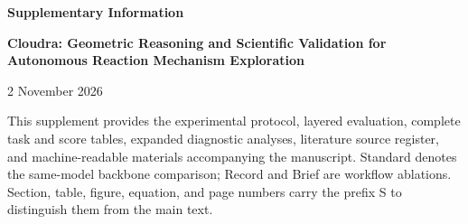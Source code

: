 \documentclass[10pt,a4paper]{article}
\begin{document}
\begin{center}
{\LARGE\bfseries Supplementary Information\par}
\vspace{0.6em}
{\large\bfseries Cloudra: Geometric Reasoning and Scientific Validation for Autonomous Reaction Mechanism Exploration\par}
\vspace{0.6em}

\vspace{0.6em}
{\small 2 November 2026\par}
\end{center}
\noindent This supplement provides the experimental protocol, layered evaluation, complete task and score tables, expanded diagnostic analyses, literature source register, and machine-readable materials accompanying the manuscript. Standard denotes the same-model backbone comparison; Record and Brief are workflow ablations. Section, table, figure, equation, and page numbers carry the prefix S to distinguish them from the main text.
\tableofcontents










\end{document}
